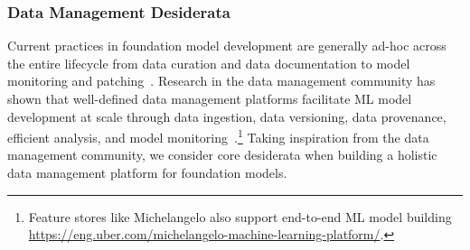 \subsubsection{Data Management Desiderata}
\label{sec:data-desiderata}

Current practices in foundation model development are generally ad-hoc across the entire lifecycle from data curation and data documentation to model monitoring and patching~\citep{gebru2018datasheets, bandy2021addressing, bender2018data}. Research in the data management community has shown that well-defined data management platforms facilitate ML model development at scale through data ingestion, data versioning, data provenance, efficient analysis, and model monitoring~\citep{hellerstein2005readings, agrawal2019cloudy, vartak2016modeldb, ikeda2010panda}.\footnote{Feature stores like Michelangelo also support end-to-end ML model building \url{https://eng.uber.com/michelangelo-machine-learning-platform/}.} Taking inspiration from the data management community, we consider core desiderata when building a holistic data management platform for foundation models. 
